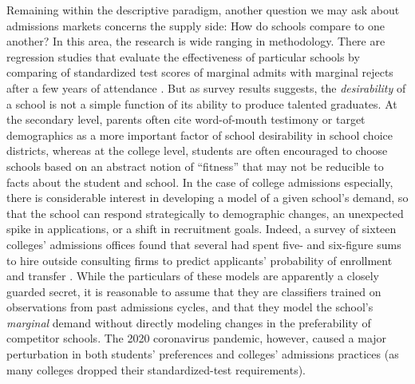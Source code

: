\documentclass[12pt]{article}
\theoremstyle{definition}
\begin{document}
Remaining within the descriptive paradigm, another question we may ask about admissions markets concerns the supply side: How do schools compare to one another? In this area, the research is wide ranging in methodology. There are regression studies that evaluate the effectiveness of particular schools by comparing of standardized test scores of marginal admits with marginal rejects after a few years of attendance \parencite[][]{impactofattending}. But as survey results suggests, the \emph{desirability} of a school is not a simple function of its ability to produce talented graduates. At the secondary level, parents often cite word-of-mouth testimony or target demographics as a more important factor of school desirability \parencite[][]{howdoparentschooseschools} in school choice districts, whereas at the college level, students are often encouraged to choose schools based on an abstract notion of ``fitness'' that may not be reducible to facts about the student and school. In the case of college admissions especially, there is considerable interest in developing a model of a given school's demand, so that the school can respond strategically to demographic changes, an unexpected spike in applications, or a shift in recruitment goals. Indeed, a survey of sixteen colleges' admissions offices found that several had spent five- and six-figure sums to hire outside consulting firms to predict applicants' probability of enrollment and transfer \parencite[][]{estimatingapplications}. While the particulars of these models are apparently a closely guarded secret, it is reasonable to assume that they are classifiers trained on observations from past admissions cycles, and that they model the school's \emph{marginal} demand without directly modeling changes in the preferability of competitor schools. The 2020 coronavirus pandemic, however, caused a major perturbation in both students' preferences \parencite[][]{studentsprefscovid} and colleges' admissions practices (as many colleges dropped their standardized-test requirements). 
\end{document}

